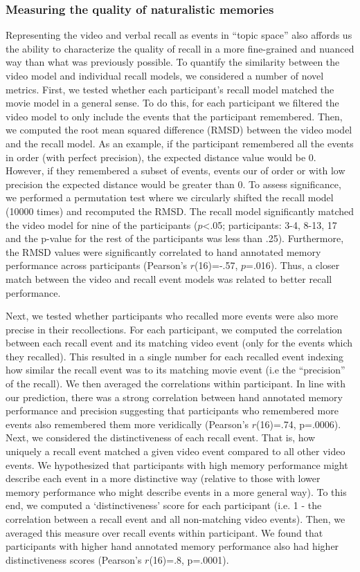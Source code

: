 \documentclass{article}
\begin{document}
{ \subsubsection{Measuring the quality of naturalistic memories}
 Representing the video and verbal recall as events in ``topic space'' also affords us the ability to characterize the quality of recall in a more fine-grained and nuanced way than what was previously possible. To quantify the similarity between the video model and individual recall models, we considered a number of novel metrics.  First, we tested whether each participant's recall model matched the movie model in a general sense. To do this, for each participant we filtered the video model to only include the events that the participant remembered. Then, we computed the root mean squared difference (RMSD) between the video model and the recall model. As an example, if the participant remembered all the events in order (with perfect precision), the expected distance value would be 0. However, if they remembered a subset of events, events our of order or with low precision the expected distance would be greater than 0. To assess significance, we performed a permutation test where we circularly shifted the recall model (10000 times) and recomputed the RMSD. The recall model significantly matched the video model for nine of the participants ($p$<.05; participants: 3-4, 8-13, 17 and the p-value for the rest of the participants was less than .25). Furthermore, the RMSD values were significantly correlated to hand annotated memory performance across participants (Pearson's $r$(16)=-.57, $p$=.016). Thus, a closer match between the video and recall event models was related to better recall performance.

 Next, we tested whether participants who recalled more events were also more precise in their recollections. For each participant, we computed the correlation between each recall event and its matching video event (only for the events which they recalled). This resulted in a single number for each recalled event indexing how similar the recall event was to its matching movie event (i.e the ``precision'' of the recall). We then averaged the correlations within participant. In line with our prediction, there was a strong correlation between hand annotated memory performance and precision suggesting that participants who remembered more events also remembered them more veridically (Pearson's $r$(16)=.74, p=.0006). Next, we considered the distinctiveness of each recall event. That is, how uniquely a recall event matched a given video event compared to all other video events. We hypothesized that participants with high memory performance might describe each event in a more distinctive way (relative to those with lower memory performance who might describe events in a more general way). To this end, we computed a `distinctiveness' score for each participant (i.e. 1 - the correlation between a recall event and all non-matching video events).  Then, we averaged this measure over recall events within participant.  We found that participants with higher hand annotated memory performance also had higher distinctiveness scores (Pearson's $r$(16)=.8, p=.0001).

}
\end{document}
